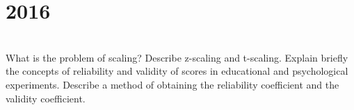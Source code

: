 \section*{2016}
\vspace{-.5cm}
\hrulefill \smallskip\\
 What is the problem of scaling? Describe z-scaling and t-scaling.
\myline
{} Explain briefly the concepts of reliability and validity of scores in educational and psychological experiments. Describe a method of obtaining the reliability coefficient and the validity coefficient.
